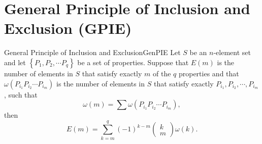 \documentclass[math]{amznotes}
\theoremstyle{remark}
\begin{document}
\section{General Principle of Inclusion and Exclusion (GPIE)}
\begin{thmbox}{General Principle of Inclusion and Exclusion}{GenPIE}
    Let $S$ be an $n$-element set and let $\left\{P_1, P_2, \cdots P_q\right\}$ be a set of properties. Suppose that $E(m)$ is the number of elements in $S$ that satisfy exactly $m$ of the $q$ properties and that $\omega(P_{i_1}P_{i_2}\cdots P_{i_m})$ is the number of elements in $S$ that satisfy exactly $P_{i_1}, P_{i_2},\cdots, P_{i_m}$, such that
    \begin{equation*}
        \omega(m) = \sum \omega(P_{i_1}P_{i_2}\cdots P_{i_m}),
    \end{equation*}
    then
    \begin{equation*}
        E(m) = \sum_{k = m}^{q}(-1)^{k - m}\begin{pmatrix}
            k \\
            m
        \end{pmatrix}\omega(k).
    \end{equation*}
\end{thmbox}
\end{document}
